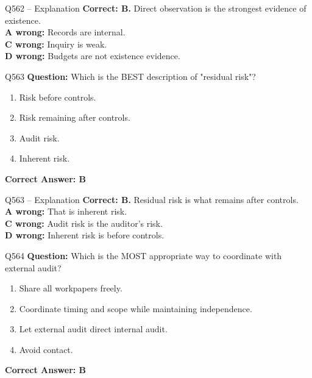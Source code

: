 \documentclass[aspectratio=169,10pt]{beamer}
\begin{document}
	\begin{frame}[t]{Q562 -- Explanation}
		\small
		\textbf{Correct: B.} Direct observation is the strongest evidence of existence. \\[4pt]
		\textbf{A wrong:} Records are internal. \\[2pt]
		\textbf{C wrong:} Inquiry is weak. \\[2pt]
		\textbf{D wrong:} Budgets are not existence evidence.
	\end{frame}
	
	\begin{frame}[t]{Q563}
		\small
		\textbf{Question:} Which is the BEST description of "residual risk"?
		\begin{enumerate}[label=\Alph*.,itemsep=1pt,topsep=2pt]
			\item Risk before controls.
			\item Risk remaining after controls.
			\item Audit risk.
			\item Inherent risk.
		\end{enumerate}
		\vspace{4pt}
		\textbf{Correct Answer: B}
	\end{frame}
	
	\begin{frame}[t]{Q563 -- Explanation}
		\small
		\textbf{Correct: B.} Residual risk is what remains after controls. \\[4pt]
		\textbf{A wrong:} That is inherent risk. \\[2pt]
		\textbf{C wrong:} Audit risk is the auditor's risk. \\[2pt]
		\textbf{D wrong:} Inherent risk is before controls.
	\end{frame}
	
	\begin{frame}[t]{Q564}
		\small
		\textbf{Question:} Which is the MOST appropriate way to coordinate with external audit?
		\begin{enumerate}[label=\Alph*.,itemsep=1pt,topsep=2pt]
			\item Share all workpapers freely.
			\item Coordinate timing and scope while maintaining independence.
			\item Let external audit direct internal audit.
			\item Avoid contact.
		\end{enumerate}
		\vspace{4pt}
		\textbf{Correct Answer: B}
	\end{frame}
	
\end{document}
